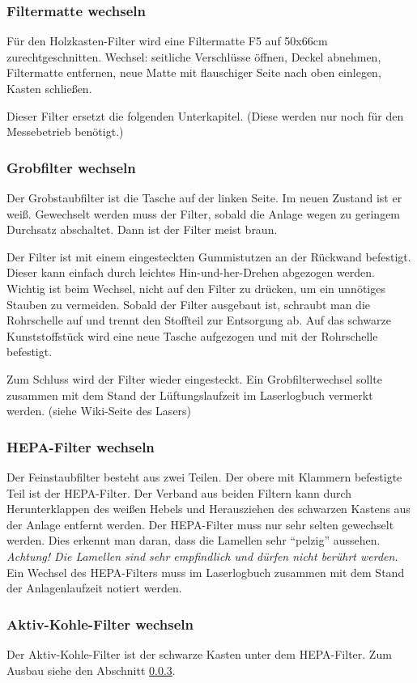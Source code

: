 \documentclass{\basedir/fablab-document}
\begin{document}
	\subsubsection{Filtermatte wechseln}
	Für den Holzkasten-Filter wird eine Filtermatte F5 auf 50x66cm zurechtgeschnitten.
	Wechsel: seitliche Verschlüsse öffnen, Deckel abnehmen, Filtermatte entfernen, neue Matte mit flauschiger Seite nach oben einlegen, Kasten schließen.

	Dieser Filter ersetzt die folgenden Unterkapitel. (Diese werden nur noch für den Messebetrieb benötigt.)
	\subsubsection{Grobfilter wechseln}
	Der Grobstaubfilter ist die Tasche auf der linken Seite. Im neuen Zustand ist er weiß. Gewechselt werden muss der Filter, sobald die Anlage wegen zu geringem Durchsatz abschaltet. Dann ist der Filter meist braun.

	Der Filter ist mit einem eingesteckten Gummistutzen an der Rückwand befestigt. Dieser kann einfach durch leichtes Hin-und-her-Drehen abgezogen werden. Wichtig ist beim Wechsel, nicht auf den Filter zu drücken, um ein unnötiges Stauben zu vermeiden. Sobald der Filter ausgebaut ist, schraubt man die Rohrschelle auf und trennt den Stoffteil zur Entsorgung ab. Auf das schwarze Kunststoffstück wird eine neue Tasche aufgezogen und mit der Rohrschelle befestigt.

	Zum Schluss wird der Filter wieder eingesteckt. Ein Grobfilterwechsel sollte zusammen mit dem Stand der Lüftungslaufzeit im Laserlogbuch vermerkt werden. (siehe Wiki-Seite des Lasers)
	\subsubsection{HEPA-Filter wechseln}
	\label{subsubsec:HEPA-Filter}
	Der Feinstaubfilter besteht aus zwei Teilen. Der obere mit Klammern befestigte Teil ist der HEPA-Filter. Der Verband aus beiden Filtern kann durch Herunterklappen des weißen Hebels und Herausziehen des schwarzen Kastens aus der Anlage entfernt werden.
	Der HEPA-Filter muss nur sehr selten gewechselt werden. Dies erkennt man daran, dass die Lamellen sehr \enquote{pelzig} aussehen. \emph{Achtung! Die Lamellen sind sehr empfindlich und dürfen nicht berührt werden.}
	Ein Wechsel des HEPA-Filters muss im Laserlogbuch zusammen mit dem Stand der Anlagenlaufzeit notiert werden.
	\subsubsection{Aktiv-Kohle-Filter wechseln}
	Der Aktiv-Kohle-Filter ist der schwarze Kasten unter dem HEPA-Filter. Zum Ausbau siehe den Abschnitt \ref{subsubsec:HEPA-Filter}.
\end{document}
